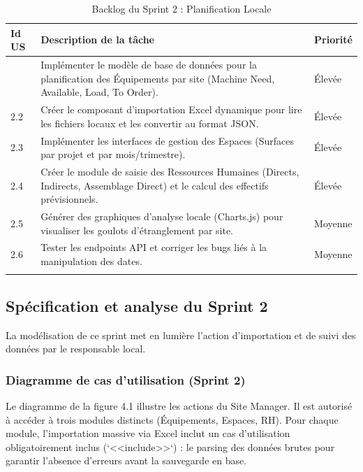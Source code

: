 \begin{longtable}{|m{1.5cm}|m{10cm}|m{2cm}|}
    \hline 
    \textbf{Id US} & \textbf{Description de la tâche} & \textbf{Priorité}\\
    \hline
    \endhead
    \hline
    \endfoot
    \endlastfoot
    \hline  
    2.1 & Implémenter le modèle de base de données pour la planification des Équipements par site (Machine Need, Available, Load, To Order). & Élevée \\
    \hline
    2.2 & Créer le composant d'importation Excel dynamique pour lire les fichiers locaux et les convertir au format JSON. & Élevée \\
    \hline
    2.3 & Implémenter les interfaces de gestion des Espaces (Surfaces par projet et par mois/trimestre). & Élevée \\
    \hline  
    2.4 & Créer le module de saisie des Ressources Humaines (Directs, Indirects, Assemblage Direct) et le calcul des effectifs prévisionnels. & Élevée \\
    \hline
    2.5 & Générer des graphiques d'analyse locale (Charts.js) pour visualiser les goulots d'étranglement par site. & Moyenne \\
    \hline
    2.6 & Tester les endpoints API et corriger les bugs liés à la manipulation des dates. & Moyenne \\
    \hline
    \captionsetup{justification=centering,margin=1.5cm}
    \caption{Backlog du Sprint 2 : Planification Locale}
\end{longtable}

\subsection{Spécification et analyse du Sprint 2}

La modélisation de ce sprint met en lumière l'action d'importation et de suivi des données par le responsable local.

\subsubsection{Diagramme de cas d'utilisation (Sprint 2)}

Le diagramme de la figure 4.1 illustre les actions du Site Manager. Il est autorisé à accéder à trois modules distincts (Équipements, Espaces, RH). Pour chaque module, l'importation massive via Excel inclut un cas d'utilisation obligatoirement inclus (`<<include>>`) : le parsing des données brutes pour garantir l'absence d'erreurs avant la sauvegarde en base.


